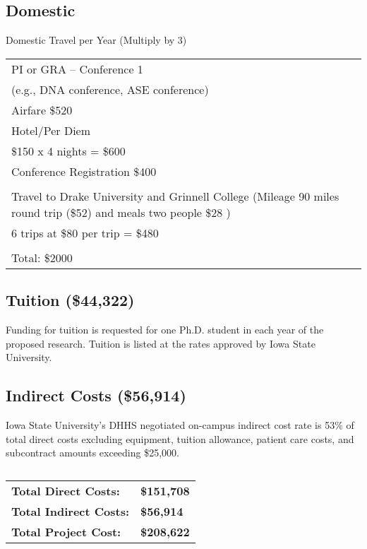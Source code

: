 \documentclass[12pt,letterpaper]{article}
\begin{document}
	\subsection*{Domestic}
	\begin{center}
		Domestic Travel per Year (Multiply by 3)
	\begin{tabular}{|p{3in}|}
		\hline PI or GRA -- Conference 1 \\ (e.g., DNA conference, ASE conference) \\
		\hline Airfare \$520 \\
		\hline Hotel/Per Diem\\ \$150 x 4 nights = \$600 \\
		\hline Conference Registration \$400 \\

		\hline \\
		\hline Travel to Drake University and Grinnell College  (Mileage 90 miles round trip (\$52) and meals two people \$28 ) \\
		\hline 6 trips at \$80 per trip = \$480 \\
		\hline \\
		\hline Total: \$2000\\
		\hline
		
	\end{tabular}
\end{center}
	
	
	
	\subsection*{Tuition (\$44,322)}
	Funding for tuition is requested for one Ph.D. student in each year of the proposed research.  Tuition is listed at the rates approved by Iowa State University.
	
	\subsection*{Indirect Costs (\$56,914)}
	Iowa State University's DHHS negotiated on-campus indirect cost rate is 53\% of total direct costs excluding equipment, tuition allowance, patient care costs, and subcontract amounts exceeding \$25,000.
	
	\subsection*{}
	
	\begin{tabular}{ll}
			{\large \bf Total Direct Costs:} & {\large \bf \$151,708 }\\
			{\large \bf Total Indirect Costs:} & {\large \bf \$56,914}\\
			{\large \bf Total Project Cost:} & {\large \bf \$208,622}
	\end{tabular}

	
\end{document}
